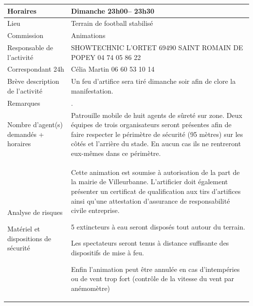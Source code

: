 \documentclass[hidelinks, paper=a4, fontsize=13pt]{report}
\begin{document}
\begin{tabular}{ | p{6cm} | p{10cm} | }
\hline
	Horaires & Dimanche 23h00– 23h30 \\ \hline
	Lieu & Terrain de football stabilisé \\ \hline
	Commission & Animations \\ \hline
	Responsable de l'activité & SHOWTECHNIC 
L'ORTET 
69490 SAINT ROMAIN DE POPEY
04 74 05 86 22 \\ \hline

	Correspondant 24h & Célia Martin 06 60 53 10 14 \\ \hline

	Brève description de l'activité & Un feu d’artifice sera tiré dimanche soir afin de clore la manifestation. \\ \hline

	Remarques & . \\ \hline
	Nombre d’agent(s) demandés + horaires
 & Patrouille mobile de huit agents de sûreté sur zone.
Deux équipes de trois organisateurs seront présentes afin de faire respecter le périmètre de sécurité (95 mètres) sur les côtés et l’arrière du stade. En aucun cas ils ne rentreront eux-mêmes dans ce périmètre. \\ \hline
	Analyse de risques

Matériel et dispositions de sécurité & Cette animation est soumise à autorisation de la part de la mairie de Villeurbanne. L’artificier doit également présenter un certificat de qualification aux tirs d’artifices ainsi qu’une attestation d’assurance de responsabilité civile entreprise.

5 extincteurs à eau seront disposés tout autour du terrain.

Les spectateurs seront tenus à distance suffisante des dispositifs de mise à feu.

Enfin l’animation peut être annulée en cas d’intempéries ou de vent trop fort (contrôle de la vitesse du vent par anémomètre) \\ \hline
\end{tabular}
\end{document}
